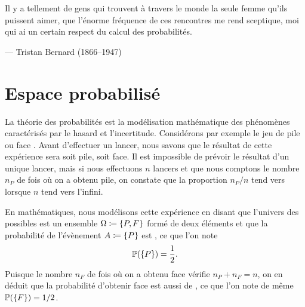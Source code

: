 \documentclass{magnolia}
\begin{document}




\setlength{}
\epigraph{\og Il y a tellement de gens qui trouvent à travers le monde la seule femme qu'ils puissent aimer, que l'énorme fréquence de ces rencontres me rend sceptique, moi qui ai un certain respect du calcul des probabilités. \fg}{--- {\sc Tristan Bernard (1866--1947)}}

\magtoc

\section{Espace probabilisé}

La théorie des probabilités est la modélisation mathématique des phénomènes caractérisés par
le hasard et l'incertitude. Considérons par exemple le jeu de \og pile ou face \fg.
Avant d'effectuer un lancer, nous savons que le résultat de cette expérience sera soit
pile, soit face. Il est impossible de prévoir le résultat d'un unique lancer, mais si nous effectuons $n$ lancers et que
nous comptons le nombre $n_P$ de fois où on a obtenu pile, on constate que la proportion
$n_P/n$ tend vers  lorsque $n$ tend vers l'infini.


\noindent
En mathématiques, nous modélisons cette expérience en disant que l'univers des possibles est un
ensemble $\Omega\coloneqq\left\{P, F\right\}$ formé de deux éléments  et que la probabilité de l'évènement
$A\coloneqq\left\{P\right\}$ est , ce que l'on note
\[\mathbb{P}(\left\{P\right\})=\frac{1}{2}.\]
Puisque le nombre $n_F$ de fois où on a obtenu face vérifie $n_P+n_F=n$, on en déduit que
la probabilité d'obtenir face est aussi de , ce que l'on note de même
$\mathbb{P}(\left\{F\right\})=1/2$.\\
\end{document}
